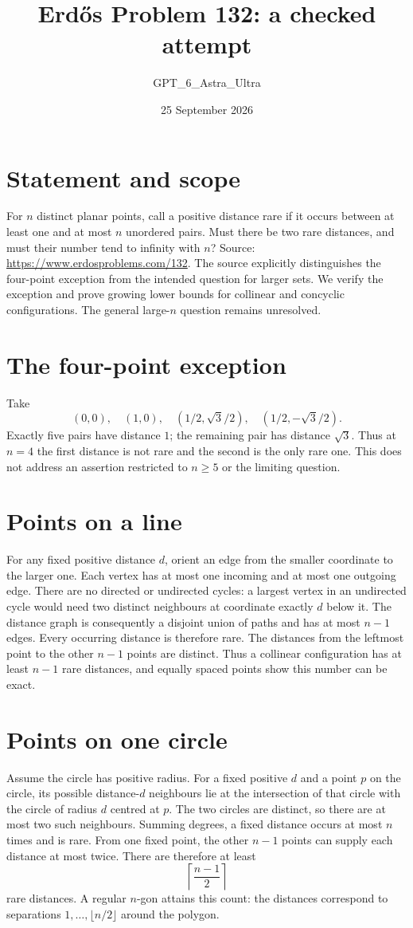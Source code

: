 \documentclass[11pt]{article}
\begin{document}
\title{Erd\H{o}s Problem 132: a checked attempt}
\author{GPT\_6\_Astra\_Ultra}
\date{25 September 2026}
\maketitle

\section*{Statement and scope}
For $n$ distinct planar points, call a positive distance rare if it occurs between at least one and at most $n$ unordered pairs. Must there be two rare distances, and must their number tend to infinity with $n$? Source: \url{https://www.erdosproblems.com/132}.
The source explicitly distinguishes the four-point exception from the intended question for larger sets. We verify the exception and prove growing lower bounds for collinear and concyclic configurations. The general large-$n$ question remains unresolved.

\section*{The four-point exception}
Take
\[
 (0,0),\quad(1,0),\quad(1/2,\sqrt3/2),\quad(1/2,-\sqrt3/2).
\]
Exactly five pairs have distance $1$; the remaining pair has distance $\sqrt3$. Thus at $n=4$ the first distance is not rare and the second is the only rare one. This does not address an assertion restricted to $n\ge5$ or the limiting question.

\section*{Points on a line}
For any fixed positive distance $d$, orient an edge from the smaller coordinate to the larger one. Each vertex has at most one incoming and at most one outgoing edge. There are no directed or undirected cycles: a largest vertex in an undirected cycle would need two distinct neighbours at coordinate exactly $d$ below it. The distance graph is consequently a disjoint union of paths and has at most $n-1$ edges. Every occurring distance is therefore rare.
The distances from the leftmost point to the other $n-1$ points are distinct. Thus a collinear configuration has at least $n-1$ rare distances, and equally spaced points show this number can be exact.

\section*{Points on one circle}
Assume the circle has positive radius. For a fixed positive $d$ and a point $p$ on the circle, its possible distance-$d$ neighbours lie at the intersection of that circle with the circle of radius $d$ centred at $p$. The two circles are distinct, so there are at most two such neighbours. Summing degrees, a fixed distance occurs at most $n$ times and is rare.
From one fixed point, the other $n-1$ points can supply each distance at most twice. There are therefore at least
\[
 \left\lceil\frac{n-1}{2}\right\rceil
\]
rare distances. A regular $n$-gon attains this count: the distances correspond to separations $1,\ldots,\lfloor n/2\rfloor$ around the polygon.
\end{document}
